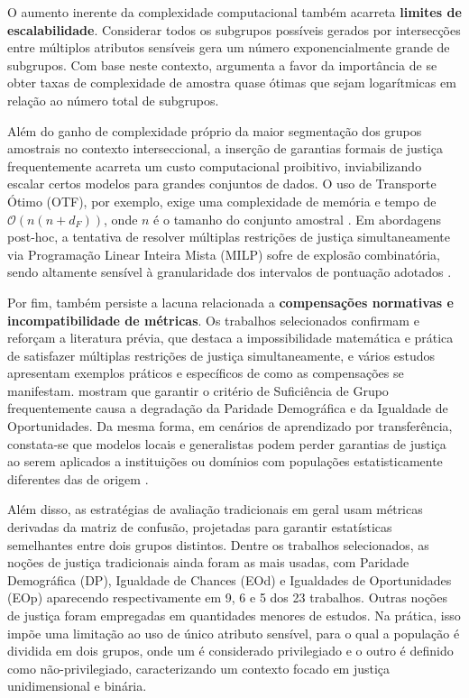 O aumento inerente da complexidade computacional também acarreta \textbf{limites de escalabilidade}. Considerar todos os subgrupos possíveis gerados por intersecções entre múltiplos atributos sensíveis gera um número exponencialmente grande de subgrupos. Com base neste contexto, \citet{deng2024multi} argumenta a favor da importância de se obter taxas de complexidade de amostra quase ótimas que sejam logarítmicas em relação ao número total de subgrupos.

Além do ganho de complexidade próprio da maior segmentação dos grupos amostrais no contexto interseccional, a inserção de garantias formais de justiça frequentemente acarreta um custo computacional proibitivo, inviabilizando escalar certos modelos para grandes conjuntos de dados. O uso de Transporte Ótimo (OTF), por exemplo, exige uma complexidade de memória e tempo de $\mathcal{O}(n(n + d_F))$, onde $n$ é o tamanho do conjunto amostral \cite{buyl2022optimal}. Em abordagens post-hoc, a tentativa de resolver múltiplas restrições de justiça simultaneamente via Programação Linear Inteira Mista (MILP) sofre de explosão combinatória, sendo altamente sensível à granularidade dos intervalos de pontuação adotados \cite{hsu2022pushing}.

Por fim, também persiste a lacuna relacionada a \textbf{compensações normativas e incompatibilidade de métricas}. Os trabalhos selecionados confirmam e reforçam a literatura prévia, que destaca a impossibilidade matemática e prática de satisfazer múltiplas restrições de justiça simultaneamente, e vários estudos apresentam exemplos práticos e específicos de como as compensações se manifestam. \citet{shui2022learning} mostram que garantir o critério de Suficiência de Grupo frequentemente causa a degradação da Paridade Demográfica e da Igualdade de Oportunidades. Da mesma forma, em cenários de aprendizado por transferência, constata-se que modelos locais e generalistas podem perder garantias de justiça ao serem aplicados a instituições ou domínios com populações estatisticamente diferentes das de origem \cite{gardner2023cross}.

Além disso, as estratégias de avaliação tradicionais em geral usam métricas derivadas da matriz de confusão, projetadas para garantir estatísticas semelhantes entre dois grupos distintos. Dentre os trabalhos selecionados, as noções de justiça tradicionais ainda foram as mais usadas, com Paridade Demográfica (DP), Igualdade de Chances (EOd) e Igualdades de Oportunidades (EOp) aparecendo respectivamente em 9, 6 e 5 dos 23 trabalhos. Outras noções de justiça foram empregadas em quantidades menores de estudos. Na prática, isso impõe uma limitação ao uso de único atributo sensível, para o qual a população é dividida em dois grupos, onde um é considerado privilegiado e o outro é definido como não-privilegiado, caracterizando um contexto focado em justiça unidimensional e binária.

